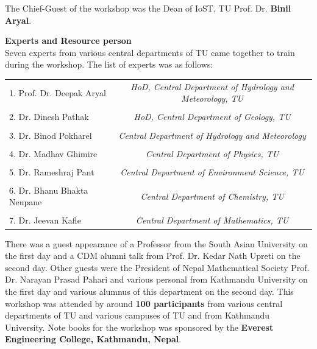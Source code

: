 \documentclass[a4paper,12pt]{report}
\begin{document}
\vspace{5mm}
\noindent
The Chief-Guest of the workshop was the Dean of IoST, TU Prof. Dr. \textbf{Binil Aryal}.
\clearpage

\noindent
{\bfseries \Large Experts and Resource person}\\[3mm]
Seven experts from various central departments of TU came together to train during the workshop. The list of experts was as follows:

\begin{table}[h!]
\centering
  \begin{tcolorbox}[colframe=blue!52, colback=white, width=\linewidth]
\centering  \footnotesize
\begin{tabular}{l||c}

    1. Prof. Dr. Deepak Aryal &
    \textit{HoD, Central Department of Hydrology and Meteorology, TU}\\
    \\
    2. Dr. Dinesh Pathak &
    \textit{HoD, Central Department of Geology, TU}\\
    \\
    3. Dr. Binod Pokharel &
    \textit{Central Department of Hydrology and Meteorology}\\
    \\
    4. Dr. Madhav Ghimire &
    \textit{Central Department of Physics, TU}\\
    \\
    5. Dr. Rameshraj Pant &
    \textit{Central Department of Environment Science, TU}\\
    \\
    6. Dr. Bhanu Bhakta Neupane &
    \textit{Central Department of Chemistry, TU}\\
    \\
    7. Dr. Jeevan Kafle &
    \textit{Central Department of Mathematics, TU}\\
    \end{tabular}
  \end{tcolorbox}
\end{table}

\noindent
There was a guest appearance of a Professor from the South Asian University on the first day and a CDM alumni talk from Prof. Dr. Kedar Nath Upreti on the second day. Other guests were the President of Nepal Mathematical Society Prof. Dr. Narayan Prasad Pahari and various personal from Kathmandu University on the first day and various alumnus of this department on the second day. This workshop was attended by around \textbf{100 participants} from various central departments of TU and various campuses of TU and from Kathmandu University. Note books for the workshop was sponsored by the \textbf{Everest Engineering College, Kathmandu, Nepal}.
\end{document}
